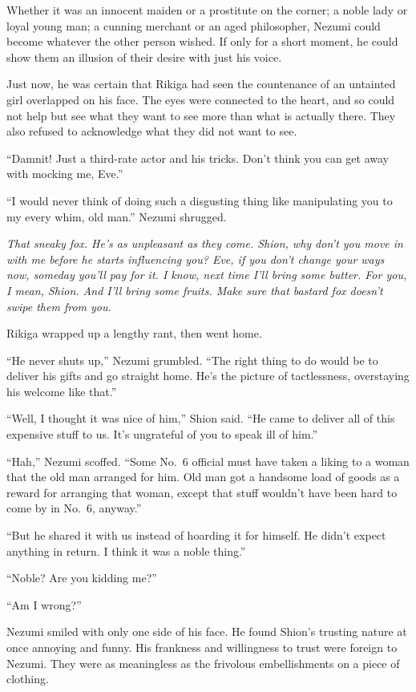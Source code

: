 Whether it was an innocent maiden or a prostitute on the corner; a noble
lady or loyal young man; a cunning merchant or an aged philosopher,
Nezumi could become whatever the other person wished. If only for a
short moment, he could show them an illusion of their desire with just
his voice.

Just now, he was certain that Rikiga had seen the countenance of an
untainted girl overlapped on his face. The eyes were connected to the
heart, and so could not help but see what they want to see more than
what is actually there. They also refused to acknowledge what they did
not want to see.

``Damnit! Just a third-rate actor and his tricks. Don't think you can
get away with mocking me, Eve.''

``I would never think of doing such a disgusting thing like manipulating
you to my every whim, old man.'' Nezumi shrugged.

\emph{That sneaky fox. He's as unpleasant as they come. Shion, why don't you
move in with me before he starts influencing you? Eve, if you don't
change your ways now, someday you'll pay for it. I know, next time I'll
bring some butter. For you, I mean, Shion. And I'll bring some fruits.
Make sure that bastard fox doesn't swipe them from you.}

Rikiga wrapped up a lengthy rant, then went home.

``He never shuts up,'' Nezumi grumbled. ``The right thing to do would be
to deliver his gifts and go straight home. He's the picture of
tactlessness, overstaying his welcome like that.''

``Well, I thought it was nice of him,'' Shion said. ``He came to deliver
all of this expensive stuff to us. It's ungrateful of you to speak ill
of him.''

``Hah,'' Nezumi scoffed. ``Some No.~6 official must have taken a liking
to a woman that the old man arranged for him. Old man got a handsome
load of goods as a reward for arranging that woman, except that stuff
wouldn't have been hard to come by in No.~6, anyway.''

``But he shared it with us instead of hoarding it for himself. He didn't
expect anything in return. I think it was a noble thing.''

``Noble? Are you kidding me?''

``Am I wrong?''

Nezumi smiled with only one side of his face. He found Shion's trusting
nature at once annoying and funny. His frankness and willingness to
trust were foreign to Nezumi. They were as meaningless as the frivolous
embellishments on a piece of clothing.

